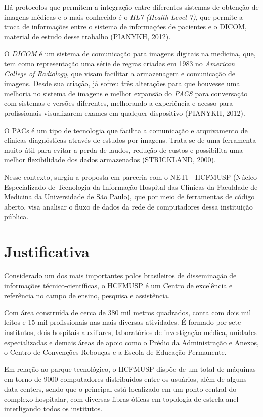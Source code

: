 \documentclass[
	12pt,				%
	openright,			%
	twoside,			%
	a4paper,			%
	english,			%
	french,				%
	spanish,			%
	brazil				%
	]{abntex2}
\begin{document}
Há protocolos que permitem a integração entre diferentes sistemas de obtenção de imagens médicas e o mais conhecido é o \emph{HL7 (Health Level 7)}, que permite a troca de informações entre o sistema de informações de pacientes e o DICOM, material de estudo desse trabalho (PIANYKH, 2012).

O  \emph{DICOM} é um sistema de comunicação para imagens digitais na medicina, que, tem como representação uma série de regras criadas em 1983 no  \emph{American College of Radiology}, que visam facilitar a armazenagem e comunicação de imagens. Desde sua criação, já sofreu três alterações para que houvesse uma melhoria no sistema de imagens e melhor expansão do  \emph{PACS} para conversação com sistemas e versões diferentes, melhorando a experiência e acesso para profissionais visualizarem exames em qualquer dispositivo (PIANYKH, 2012).

O PACs é um tipo de tecnologia que facilita a comunicação e arquivamento de clínicas diagnósticas através de estudos por imagens. Trata-se de uma ferramenta muito útil para evitar a perda de laudos, redução de custos e possibilita uma melhor flexibilidade dos dados armazenados (STRICKLAND, 2000).

Nesse contexto, surgiu a proposta em parceria com o NETI - HCFMUSP (Núcleo Especializado de Tecnologia da Informação Hospital das Clínicas da Faculdade de Medicina da Universidade de São Paulo), que por meio de ferramentas de código aberto, visa analisar o fluxo de dados da rede de computadores dessa instituição pública.

\section{Justificativa}

Considerado um dos mais importantes polos brasileiros de disseminação de informações técnico-científicas, o HCFMUSP é um Centro de excelência e referência no campo de ensino, pesquisa e assistência.

Com área construída de cerca de 380 mil metros quadrados, conta com dois mil leitos e 15 mil profissionais nas mais diversas atividades. É formado por sete institutos, dois hospitais auxiliares, laboratórios de investigação médica, unidades especializadas e demais áreas de apoio como o Prédio da Administração e Anexos, o Centro de Convenções Rebouças e a Escola de Educação Permanente.

Em relação ao parque tecnológico, o HCFMUSP dispõe de um total de máquinas em torno de 9000 computadores distribuídos entre os usuários, além de alguns data centers, sendo que o principal está localizado em um ponto central do complexo hospitalar, com diversas fibras óticas em topologia de estrela-anel interligando todos os institutos. 
\end{document}
